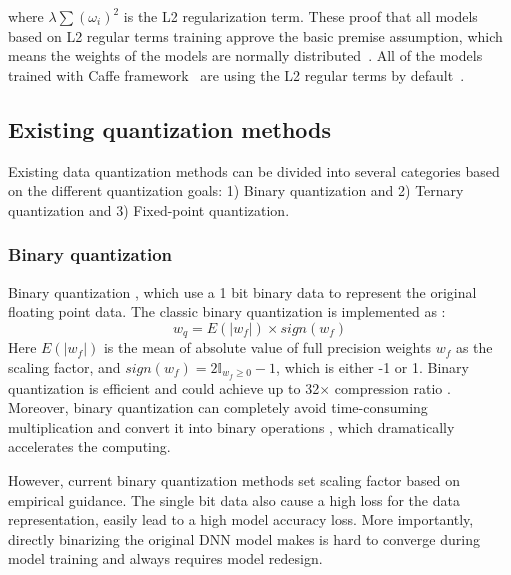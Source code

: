 where $\lambda\sum(\omega_i)^2$ is the L2 regularization term.
These proof that all models based on L2 regular terms training approve the basic premise assumption, which means the weights of the models are normally distributed~\citep{nasrabadi2007pattern,robert2014machine}.
All of the models trained with Caffe framework~\citep{jia2014caffe} are using the L2 regular terms by default~\citep{lecun1998gradient,krizhevsky2009learning,simonyan2014vgg}.

\subsection{Existing quantization methods}
Existing data quantization methods can be divided into several categories based on the different quantization goals:
1) Binary quantization and 2) Ternary quantization and 3) Fixed-point quantization.
\subsubsection{Binary quantization}
Binary quantization \citep{hubara2016binarized,zhou2016dorefa}, which use a 1 bit binary data to represent the original floating point data.
The classic binary quantization is implemented as \citep{zhou2016dorefa}:
\begin{equation}
    w_q=E(|w_f|)\times sign(w_f)
\end{equation}
Here $E(|w_f|)$ is the mean of absolute value of full precision weights $w_f$ as the scaling factor, and $sign(w_f)=2\mathbb{I}_{w_f\ge 0}-1$, which is either -1 or 1.
Binary quantization is efficient and could achieve up to 32$\times$ compression ratio \citep{hubara2016binarized}. Moreover, binary quantization can completely avoid time-consuming multiplication and convert it into binary operations \citep{rastegari2016xnor}, which dramatically accelerates the computing.

However, current binary quantization methods set scaling factor based on empirical guidance.
The single bit data also cause a high loss for the data representation, easily lead to a high model accuracy loss. 
More importantly, directly binarizing the original DNN model makes is hard to converge during model training and always requires model redesign\citep{ghasemzadeh2018rebnet}.

